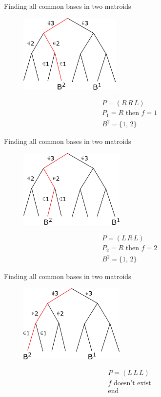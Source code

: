 \documentclass[11pt,xcolor=dvipsnames,table,dvipdfmx]{beamer}
\begin{document}
\begin{frame}{Finding all common bases in two matroids}
 \begin{figure}
  \centering
  \hspace{0.03cm}
  \includegraphics[width=5cm]{text4989-4.png}
 \end{figure}
 \begin{align*}
  &P = (R\,R\,L)\\
  &P_1 = R \text{ then } f = 1\\
  &B^2 = \{1,\,2\}
 \end{align*}
\end{frame}

\begin{frame}{Finding all common bases in two matroids}
 \begin{figure}
  \centering
  \hspace{0.2cm}
  \includegraphics[width=5.2cm]{text4989-5.png}
 \end{figure}
 \begin{align*}
  &P = (L\,R\,L)\\
  &P_2 = R \text{ then } f = 2\\
  &B^2 = \{1,\,2\}
 \end{align*}
\end{frame}

\begin{frame}{Finding all common bases in two matroids}
 \begin{figure}
  \centering
  \hspace{-0.2cm}
  \includegraphics[width=5.2cm]{text4989-6.png}
 \end{figure}
 \begin{align*}
  &P = (L\,L\,L)\\
  &f \text{ doesn't exist}\\
  &\text{end}
 \end{align*}
\end{frame}
\end{document}
